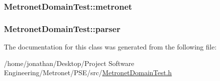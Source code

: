 \subsubsection[{\texorpdfstring{metronet}{metronet}}]{ Metronet\+Domain\+Test\+::metronet\hspace{0.3cm}{\ttfamily [protected]}}\hypertarget{class_metronet_domain_test_aa185f99af6607124a6fea8c4f63fddb7}{}\label{class_metronet_domain_test_aa185f99af6607124a6fea8c4f63fddb7}
\subsubsection[{\texorpdfstring{parser}{parser}}]{ Metronet\+Domain\+Test\+::parser\hspace{0.3cm}{\ttfamily [protected]}}\hypertarget{class_metronet_domain_test_a734067643dd85476691c5e3a29e4c43e}{}\label{class_metronet_domain_test_a734067643dd85476691c5e3a29e4c43e}


The documentation for this class was generated from the following file\+:\begin{DoxyCompactItemize}
\item 
/home/jonathan/\+Desktop/\+Project Software Engineering/\+Metronet/\+P\+S\+E/src/\hyperlink{_metronet_domain_test_8h}{Metronet\+Domain\+Test.\+h}\end{DoxyCompactItemize}
